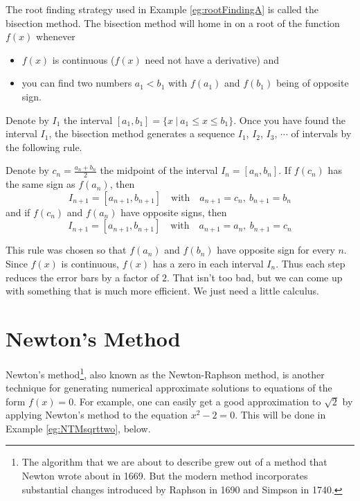 The root finding strategy used in Example \ref{eg:rootFindingA} is 
called the bisection method. The bisection method will home in on a root of the
function $f(x)$ whenever
\begin{itemize}
\item
$f(x)$ is continuous ($f(x)$ need not have a derivative) and
\item
you can find two numbers $a_1<b_1$ with $f(a_1)$ and $f(b_1)$ being of opposite 
sign. 
\end{itemize}
Denote by $I_1$ the interval $[a_1,b_1]=\big\{x\ \big|\ a_1\le x\le b_1\big\}$.
Once you have found the interval $I_1$, the bisection method generates a sequence $I_1$, 
         $I_2$, 
         $I_3$, $\cdots$ 
of intervals by the following rule.
\begin{impeqn}\label{eq:APPbisection}
Denote by $c_n=\frac{a_n+b_n}{2}$ the midpoint of the interval $I_n=[a_n,b_n]$. 
If $f(c_n)$ has the same sign as $f(a_n)$, then
  \begin{equation*}
    I_{n+1}=[a_{n+1},b_{n+1}]\quad\text{with}\quad
               a_{n+1}=c_n,\  b_{n+1}=b_n
  \end{equation*}
and if 
$f(c_n)$ and $f(a_n)$ have opposite signs, then
  \begin{equation*}
    I_{n+1}=[a_{n+1},b_{n+1}]\quad\text{with}\quad
             a_{n+1}=a_n,\  b_{n+1}=c_n
  \end{equation*}
\end{impeqn}
This rule was chosen so that $f(a_n)$ and $f(b_n)$ have opposite sign for 
every $n$.
Since $f(x)$ is continuous, $f(x)$ has a zero in each interval $I_n$.
Thus each step reduces the error bars by a factor of $2$. That isn't too 
bad, but we can come up with something that is much more efficient. 
We just need a little calculus.

\section{Newton's Method}
Newton's method\footnote{The algorithm that we are about to describe grew out of a method that Newton wrote about in 1669. But the modern method incorporates
substantial changes introduced by Raphson in 1690 and Simpson in 1740.},  
also known as the Newton-Raphson method, is another technique for generating 
numerical approximate solutions to equations of the form $f(x)=0$. For 
example, one can easily get a good approximation to $\sqrt{2}$ by 
applying Newton's method to the equation $x^2-2=0$. This will be done in 
Example \ref{eg:NTMsqrttwo}, below.


